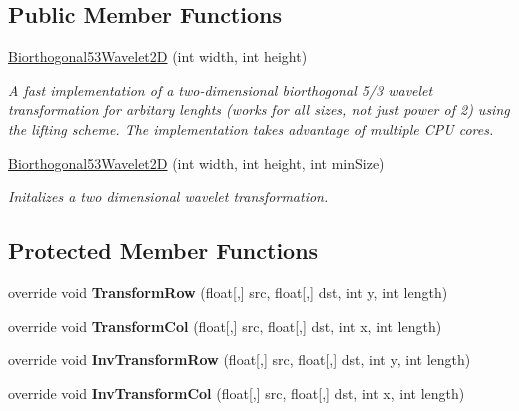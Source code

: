 \subsection*{\-Public \-Member \-Functions}
\begin{DoxyCompactItemize}
\item 
\hyperlink{class_turbo_wavelets_1_1_biorthogonal53_wavelet2_d_a8783eb5b8e032cd8cf75c5a1bb80bba0}{\-Biorthogonal53\-Wavelet2\-D} (int width, int height)
\begin{DoxyCompactList}\small\item\em \-A fast implementation of a two-\/dimensional biorthogonal 5/3 wavelet transformation for arbitary lenghts (works for all sizes, not just power of 2) using the lifting scheme. \-The implementation takes advantage of multiple \-C\-P\-U cores. \end{DoxyCompactList}\item 
\hyperlink{class_turbo_wavelets_1_1_biorthogonal53_wavelet2_d_a2d9bf97c2211d5859b3a53835bea7888}{\-Biorthogonal53\-Wavelet2\-D} (int width, int height, int min\-Size)
\begin{DoxyCompactList}\small\item\em \-Initalizes a two dimensional wavelet transformation. \end{DoxyCompactList}\end{DoxyCompactItemize}
\subsection*{\-Protected \-Member \-Functions}
\begin{DoxyCompactItemize}
\item 
\hypertarget{class_turbo_wavelets_1_1_biorthogonal53_wavelet2_d_acec9bb2730e6dee78c8f6d5c8d79a523}{override void {\bfseries \-Transform\-Row} (float\mbox{[},\mbox{]} src, float\mbox{[},\mbox{]} dst, int y, int length)}\label{class_turbo_wavelets_1_1_biorthogonal53_wavelet2_d_acec9bb2730e6dee78c8f6d5c8d79a523}

\item 
\hypertarget{class_turbo_wavelets_1_1_biorthogonal53_wavelet2_d_aa93cd7f9ac110e04678a5313336fb73f}{override void {\bfseries \-Transform\-Col} (float\mbox{[},\mbox{]} src, float\mbox{[},\mbox{]} dst, int x, int length)}\label{class_turbo_wavelets_1_1_biorthogonal53_wavelet2_d_aa93cd7f9ac110e04678a5313336fb73f}

\item 
\hypertarget{class_turbo_wavelets_1_1_biorthogonal53_wavelet2_d_a74b2789642a900fcfab4f47e023329ed}{override void {\bfseries \-Inv\-Transform\-Row} (float\mbox{[},\mbox{]} src, float\mbox{[},\mbox{]} dst, int y, int length)}\label{class_turbo_wavelets_1_1_biorthogonal53_wavelet2_d_a74b2789642a900fcfab4f47e023329ed}

\item 
\hypertarget{class_turbo_wavelets_1_1_biorthogonal53_wavelet2_d_a2f52053d7f8f2da84b0ca6964481bd06}{override void {\bfseries \-Inv\-Transform\-Col} (float\mbox{[},\mbox{]} src, float\mbox{[},\mbox{]} dst, int x, int length)}\label{class_turbo_wavelets_1_1_biorthogonal53_wavelet2_d_a2f52053d7f8f2da84b0ca6964481bd06}

\end{DoxyCompactItemize}
